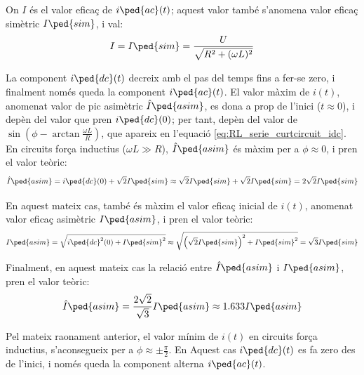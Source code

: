 On $I$ és el valor eficaç de $i\ped{ac}(t)$; aquest valor també s'anomena valor eficaç simètric $I\ped{sim}$, i val:
\begin{equation}
    I = I\ped{sim} =\frac{U}{\sqrt{R^2+(\omega L)^2}}
    \label{eq:RL_serie_curtcircuit_I}
\end{equation}

La component $i\ped{dc}(t)$ decreix amb el pas del temps fins a fer-se zero, i finalment només queda la component $i\ped{ac}(t)$. El valor màxim de $i(t)$, anomenat valor de pic asimètric $\hat{I}\ped{asim}$, es dona a prop de l'inici ($t\approx 0$), i depèn del valor que pren $i\ped{dc}(0)$;  per tant, depèn del valor de $\sin\left(\phi - \arctan\frac{\omega L}{R}\right)$, que apareix en l'equació \eqref{eq:RL_serie_curtcircuit_idc}. En circuits força inductius ($\omega L\gg R$), $\hat{I}\ped{asim}$ és màxim per a $\phi \approx 0$, i pren el valor teòric:
\begin{equation}
    \hat{I}\ped{asim} = i\ped{dc}(0) + \sqrt{2} I\ped{sim} \approx \sqrt{2} I\ped{sim} +\sqrt{2} I\ped{sim} =2 \sqrt{2} I\ped{sim}    \label{eq:I_asim_pic}
\end{equation}


En aquest mateix cas, també és màxim el valor eficaç inicial de $i(t)$, anomenat valor eficaç asimètric $I\ped{asim}$,  i pren el valor teòric:
\begin{equation}
    I\ped{asim} = \sqrt{i\ped{dc}^2(0) + I\ped{sim}^2} \approx \sqrt{\left(\sqrt{2}I\ped{sim}\right)^2 + I\ped{sim}^2} = \sqrt{3} I\ped{sim} \label{eq:I_asim_eff}
\end{equation}

Finalment, en aquest mateix cas la relació entre $\hat{I}\ped{asim}$ i $I\ped{asim}$,   pren el valor teòric:
\begin{equation}
    \hat{I}\ped{asim} = \frac{2\sqrt{2}}{\sqrt{3}} I\ped{asim} \approx
    \num{1,633} I\ped{asim}
\end{equation}

Pel mateix raonament anterior, el valor mínim de $i(t)$ en circuits força inductius, s'aconsegueix per a $\phi \approx \pm\frac{\pi}{2}$. En Aquest cas $i\ped{dc}(t)$ es fa zero des de l'inici, i només queda la component alterna $i\ped{ac}(t)$.


